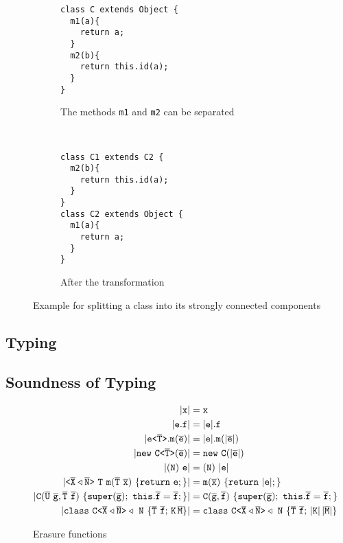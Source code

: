 \begin{figure}[tp]
    \begin{subfigure}[t]{0.49\linewidth}
\begin{lstlisting}[style=tfgj]
class C extends Object {
  m1(a){
    return a;
  }
  m2(b){
    return this.id(a);
  }
}
\end{lstlisting}
      \caption{The methods \texttt{m1} and \texttt{m2} can be separated}
    \end{subfigure}
    ~
    \begin{subfigure}[t]{0.49\linewidth}
\begin{lstlisting}[style=tfgj]
class C1 extends C2 {
  m2(b){
    return this.id(a);
  }
}
class C2 extends Object {
  m1(a){
    return a;
  }
}
\end{lstlisting}
      \caption{After the transformation}
    \end{subfigure}
    \caption{Example for splitting a class into its strongly connected components}
    \label{fig:example-decluster}
  \end{figure}

\subsection{Typing}
\label{chapter:type-rules}


\subsection{Soundness of Typing}
\label{sec:soundness-typing}
\begin{figure}[tp]
    \begin{align*}
      \Erase{\mv x} &= \mv x \\
      \Erase{\mv e.\mv f} &= \Erase{\mv e}.\mv f \\
      \Erase{\exptype{e}{\ol T}.\mathtt{m}(\ol{e})} &= \Erase{\mv e}. \mathtt{m} (\Erase{\ol e}) \\
      \Erase{\mathtt{new}\ \exptype{C}{\ol T}(\ol{e})} & = \mathtt{new}\ \mv{C}(\Erase{\ol{e}}) \\
      \Erase{(\mv N)\ \mv e} & = (\mv N)\ \Erase{\mv e} \\
      \Erase{\exptype{}{\ol{X} \triangleleft \ol{N}}\ \mv{T}\ \mathtt{m}(\ol T\ \ol{x})\ \{ \mathtt{
      return}\ \mv e; \}} & = \mathtt{m}(\ol{x})\ \{ \mathtt{ return}\ \Erase{\mv e}; \} \\
      \Erase{\mv C(\ol{U}\ \ol{g}, \ol{T}\ \ol{f})\ \{\mathtt{super}(\ol{g}); \ \mathtt{this}.\ol{f}=\ol{f};\}} & = \mv C(\ol{g}, \ol{f})\ \{\mathtt{super}(\ol{g}); \ \mathtt{this}.\ol{f}=\ol{f};\} \\
      \Erase{\mathtt{class} \ \exptype{C}{\ol{X} \triangleleft \ol{N}} \triangleleft \ \mv N\ \{ \ol{T} \ \ol{f}; \,\mv K \, \ol{M} \}} & = 
                                                                                                                                          \mathtt{class} \ \exptype{C}{\ol{X} \triangleleft \ol{N}} \triangleleft \ \mv N\ \{ \ol{T} \ \ol{f}; \,\Erase{\mv K} \, \Erase{\ol{M}} \}
    \end{align*}
    \caption{Erasure functions}
    \label{fig:erasure}
  \end{figure}

